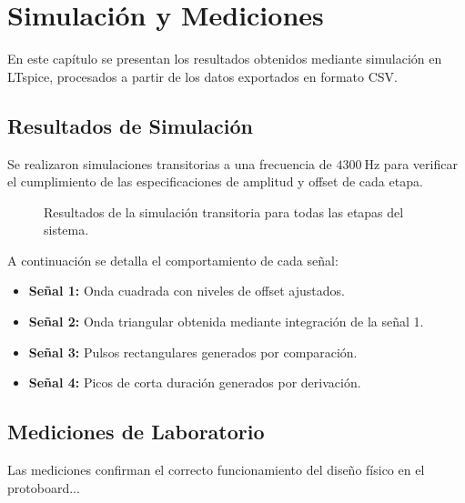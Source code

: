 \chapter{Simulación y Mediciones}
\label{chap:simulacion-mediciones}

En este capítulo se presentan los resultados obtenidos mediante simulación en LTspice, procesados a partir de los datos exportados en formato CSV.

\section{Resultados de Simulación}
Se realizaron simulaciones transitorias a una frecuencia de $\SI{4300}{\hertz}$ para verificar el cumplimiento de las especificaciones de amplitud y offset de cada etapa.

\begin{figure}[!ht]
    \centering
    
    \caption{Resultados de la simulación transitoria para todas las etapas del sistema.}
    \label{fig:plot_simulacion}
\end{figure}

A continuación se detalla el comportamiento de cada señal:

\begin{itemize}
    \item \textbf{Señal 1:} Onda cuadrada con niveles de offset ajustados.
    \item \textbf{Señal 2:} Onda triangular obtenida mediante integración de la señal 1.
    \item \textbf{Señal 3:} Pulsos rectangulares generados por comparación.
    \item \textbf{Señal 4:} Picos de corta duración generados por derivación.
\end{itemize}

\section{Mediciones de Laboratorio}
Las mediciones confirman el correcto funcionamiento del diseño físico en el protoboard...
